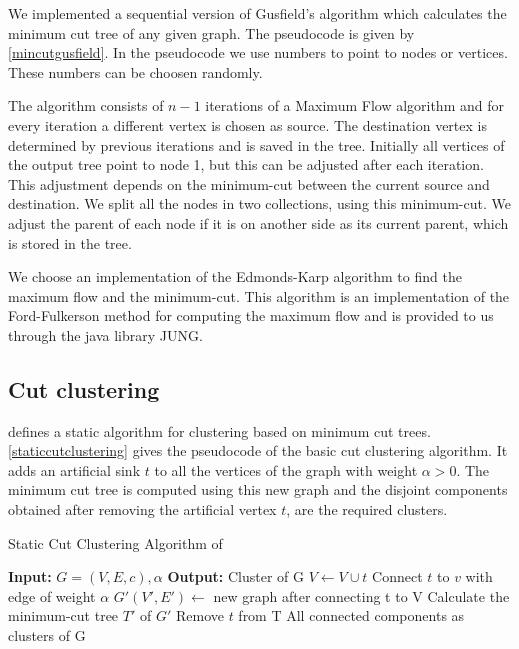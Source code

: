 We implemented a sequential version of Gusfield's algorithm which calculates the minimum cut tree of any given graph. The pseudocode is given by \ref{mincutgusfield}. In the pseudocode we use numbers to point to nodes or vertices. These numbers can be choosen randomly.

The algorithm consists of $n-1$ iterations of a Maximum Flow algorithm and for every iteration a different vertex is chosen as source. The destination vertex is determined by previous iterations and is saved in the tree. Initially all vertices of the output tree point to node 1, but this can be adjusted after each iteration. This adjustment depends on the minimum-cut between the current source and destination. We split all the nodes in two collections, using this minimum-cut. We adjust the parent of each node if it is on another side as its current parent, which is stored in the tree.

We choose an implementation of the Edmonds-Karp algorithm to find the maximum flow and the minimum-cut. This algorithm is an implementation of the Ford-Fulkerson method for computing the maximum flow and is provided to us through the java library JUNG.

\subsection{Cut clustering}

\cite{flake2004graph} defines a static algorithm for clustering based on minimum cut trees. \ref{staticcutclustering} gives the pseudocode of the basic cut clustering algorithm. It adds an artificial sink $t$ to all the vertices of the graph with weight $\alpha > 0$. The minimum cut tree is computed using this new graph and the disjoint components obtained after removing the artificial vertex $t$, are the required clusters.

\begin{algorithm}
\caption{Static Cut Clustering Algorithm of \cite{flake2004graph}}
\label{staticcutclustering}
\begin{algorithmic}
\STATE \textbf{Input:} $G = (V,E,c), \alpha$ 
\STATE \textbf{Output:} Cluster of G
\STATE $V \leftarrow V \cup t$
	\STATE Connect $t$ to $v$ with edge of weight $\alpha$
\ENDFOR
\STATE $G'(V',E') \leftarrow$ new graph after connecting t to V
\STATE Calculate the minimum-cut tree $T'$ of $G'$
\STATE Remove $t$ from T
\RETURN All connected components as clusters of G
\end{algorithmic}
\end{algorithm}


